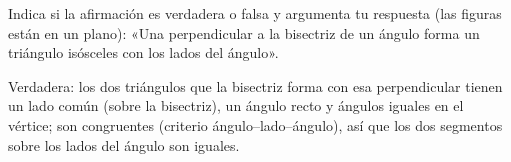 \documentclass[11pt]{article}
\begin{document}
\begin{preguntas}
\pregunta[1.5] Indica si la afirmación es verdadera o falsa y argumenta tu respuesta (las
figuras están en un plano): «Una perpendicular a la bisectriz de un ángulo forma un
triángulo isósceles con los lados del ángulo».
\begin{solucion}[5cm]
Verdadera: los dos triángulos que la bisectriz forma con esa perpendicular tienen un lado
común (sobre la bisectriz), un ángulo recto y ángulos iguales en el vértice; son congruentes
(criterio ángulo–lado–ángulo), así que los dos segmentos sobre los lados del ángulo son
iguales.
\end{solucion}

\end{preguntas}
\end{document}
